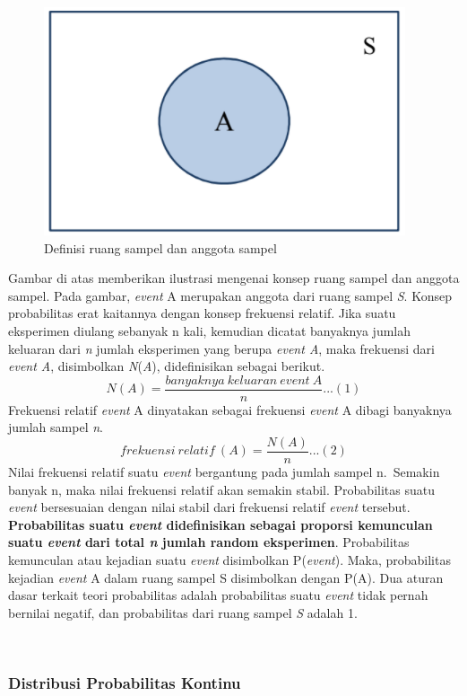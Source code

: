 \documentclass[
]{book}
\begin{document}
\begin{figure}

{\centering \includegraphics[width=0.5\linewidth]{images/screening/himpunan} 

}

\caption{Definisi ruang sampel dan anggota sampel}\label{fig:unnamed-chunk-2}
\end{figure}

Gambar di atas memberikan ilustrasi mengenai konsep ruang sampel dan anggota sampel. Pada gambar, \emph{event} A merupakan anggota dari ruang sampel \emph{S}. Konsep probabilitas erat kaitannya dengan konsep frekuensi relatif. Jika suatu eksperimen diulang sebanyak n kali, kemudian dicatat banyaknya jumlah keluaran dari \emph{n} jumlah eksperimen yang berupa \emph{event A}, maka frekuensi dari \emph{event A}, disimbolkan \emph{N}(\emph{A}), didefinisikan sebagai berikut. \[N(A)=\frac{banyaknya\ keluaran\ event\ A}{n}...(1)\]
Frekuensi relatif \emph{event} A dinyatakan sebagai frekuensi \emph{event} A dibagi banyaknya jumlah sampel \emph{n}. \[frekuensi\ relatif\ (A)=\frac{N(A)}{n}...(2)\]
Nilai frekuensi relatif suatu \emph{event} bergantung pada jumlah sampel n.~Semakin banyak n, maka nilai frekuensi relatif akan semakin stabil. Probabilitas suatu \emph{event} bersesuaian dengan nilai stabil dari frekuensi relatif \emph{event} tersebut. \textbf{Probabilitas suatu \emph{event} didefinisikan sebagai proporsi kemunculan suatu \emph{event} dari total \emph{n} jumlah random eksperimen}. Probabilitas kemunculan atau kejadian suatu \emph{event} disimbolkan P(\emph{event}). Maka, probabilitas kejadian \emph{event} A dalam ruang sampel S disimbolkan dengan P(A). Dua aturan dasar terkait teori probabilitas adalah probabilitas suatu \emph{event} tidak pernah bernilai negatif, dan probabilitas dari ruang sampel \emph{S} adalah 1.

~

\hypertarget{distribusi-probabilitas-kontinu}{%
\subsubsection{Distribusi Probabilitas Kontinu}\label{distribusi-probabilitas-kontinu}}
\end{document}
